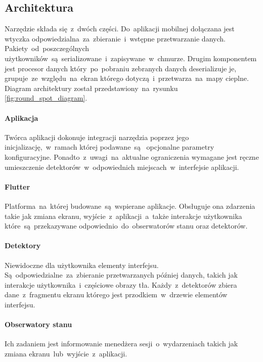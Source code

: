 \subsection{Architektura}
Narzędzie składa się~z~dwóch części. Do~aplikacji mobilnej dołączana jest wtyczka odpowiedzialna~za~zbieranie~i~wstępne przetwarzanie danych. Pakiety~od~poszczególnych użytkowników~są~serializowane~i~zapisywane~w~chmurze. Drugim komponentem jest procesor danych który~po~pobraniu zebranych danych deserializuje je, grupuje~ze~względu~na~ekran którego dotyczą~i~przetwarza~na~mapy cieplne. Diagram architektury został przedstawiony~na~rysunku \ref{fig:round_spot_diagram}.
\bigskip
{}

\paragraph{Aplikacja}
Twórca aplikacji dokonuje integracji narzędzia poprzez jego inicjalizację,~w~ramach której podawane~są~ opcjonalne parametry konfiguracyjne. Ponadto~z~uwagi~na~aktualne ograniczenia wymagane jest ręczne umieszczenie detektorów~w~odpowiednich miejscach~w~interfejsie aplikacji.

\paragraph{Flutter} Platforma~na~której budowane~są~wspierane aplikacje. Obsługuje ona zdarzenia takie jak zmiana ekranu, wyjście~z~aplikacji~a~także interakcje użytkownika które~są~przekazywane odpowiednio~do~obserwatorów stanu oraz detektorów.

\paragraph{Detektory} 
\label{par:rs_detectors}
Niewidoczne dla użytkownika elementy interfejsu. Są~odpowiedzialne~za~zbieranie przetwarzanych później danych, takich jak interakcje użytkownika~i~częściowe obrazy tła. Każdy~z~detektorów zbiera dane~z~fragmentu ekranu którego jest przodkiem~w~drzewie elementów interfejsu.

\paragraph{Obserwatory stanu} 
\label{par:rs_observers}
Ich zadaniem jest informowanie menedżera sesji~o~wydarzeniach takich jak zmiana ekranu~lub~wyjście~z~aplikacji.

